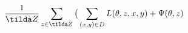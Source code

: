 \documentclass[preview]{standalone}
\begin{document}
\begin{align*}
\frac{1}{\tilda Z} \sum_{z \in \tilda Z} \big( \sum_{(x,y) \in D} L (\theta, z, x, y) + \Psi (\theta, z)
\end{align*}
\end{document}
